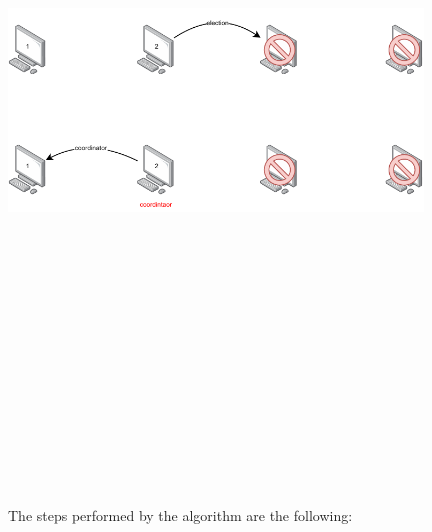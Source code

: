 \documentclass{article}
\begin{document}
\begin{center}
	\includegraphics[width=11cm, height=20cm, keepaspectratio]{assets/bully-2.pdf}
\end{center}
The steps performed by the algorithm are the following:
\end{document}
